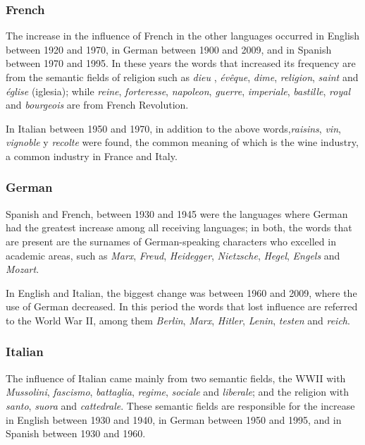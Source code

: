 \documentclass[10pt,letterpaper]{article} %
\begin{document}
\subsubsection*{French} %

The increase in the influence of French in the other languages occurred in
English between 1920 and 1970, in German between 1900 and 2009, and in Spanish
between 1970 and 1995. In these years the words that increased its frequency
are from the semantic fields of religion such as \textit{dieu} ,
\textit{évêque}, \textit{dime}, \textit{religion}, \textit{saint} and
\textit{église} (iglesia); while \textit{reine}, \textit{forteresse},
\textit{napoleon}, \textit{guerre}, \textit{imperiale}, \textit{bastille},
\textit{royal} and \textit{bourgeois} are from French Revolution.

In Italian between 1950 and 1970, in addition to the above
words,\textit{raisins}, \textit{vin}, \textit{vignoble} y \textit{recolte} were
found, the common meaning of which is the wine industry, a common industry in
France and Italy.

\subsubsection*{German} %

Spanish and French,  between 1930 and 1945 were the languages where German had the greatest
increase among all receiving languages; 
in both, the words that are present are the surnames of German-speaking
characters who excelled in academic areas, such as \textit{Marx},
\textit{Freud}, \textit{Heidegger}, \textit{Nietzsche}, \textit{Hegel},
\textit{Engels} and \textit{Mozart}.

In English and Italian, the biggest change was between 1960 and 2009, where the
use of German decreased. In this period the words that lost influence
 are
referred to the World War II, among them \textit{Berlin}, \textit{Marx},
\textit{Hitler}, \textit{Lenin}, \textit{testen}  and \textit{reich}.
\subsubsection*{Italian} %


The influence of Italian came mainly from two semantic fields, the WWII with
\textit{Mussolini}, \textit{fascismo}, \textit{battaglia}, \textit{regime},
\textit{sociale} and \textit{liberale}; and the religion with \textit{santo},
\textit{suora} and \textit{cattedrale}. These semantic fields are
responsible for the increase in English between 1930 and 1940, in German
between 1950 and 1995, and in Spanish between 1930 and 1960.
\end{document}

